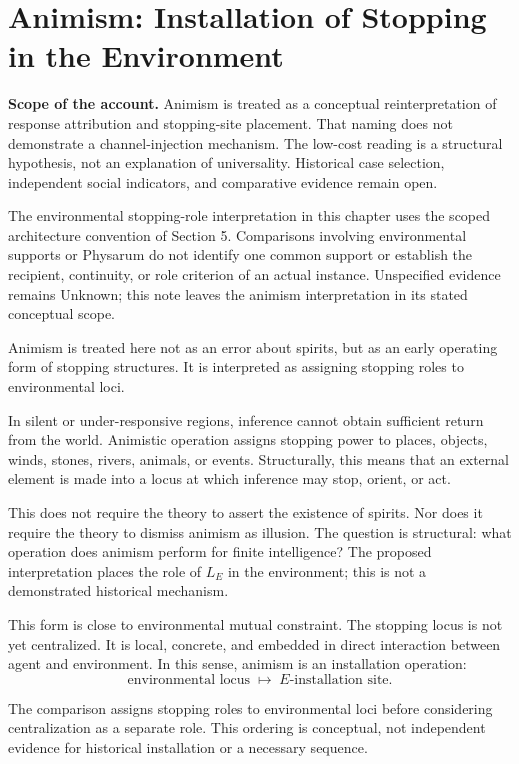 \section{Animism: Installation of Stopping in the Environment}

\noindent\textbf{Scope of the account.} Animism is treated as a conceptual reinterpretation of response attribution and stopping-site placement. That naming does not demonstrate a channel-injection mechanism. The low-cost reading is a structural hypothesis, not an explanation of universality. Historical case selection, independent social indicators, and comparative evidence remain open.

The environmental stopping-role interpretation in this chapter uses the scoped architecture convention of Section 5. Comparisons involving environmental supports or Physarum do not identify one common support or establish the recipient, continuity, or role criterion of an actual instance. Unspecified evidence remains Unknown; this note leaves the animism interpretation in its stated conceptual scope.


Animism is treated here not as an error about spirits, but as an early operating form of stopping structures. It is interpreted as assigning stopping roles to environmental loci.

In silent or under-responsive regions, inference cannot obtain sufficient return from the world. Animistic operation assigns stopping power to places, objects, winds, stones, rivers, animals, or events. Structurally, this means that an external element is made into a locus at which inference may stop, orient, or act.

This does not require the theory to assert the existence of spirits. Nor does it require the theory to dismiss animism as illusion. The question is structural: what operation does animism perform for finite intelligence? The proposed interpretation places the role of $L_E$ in the environment; this is not a demonstrated historical mechanism.

This form is close to environmental mutual constraint. The stopping locus is not yet centralized. It is local, concrete, and embedded in direct interaction between agent and environment. In this sense, animism is an installation operation:
\[
\text{environmental locus} \;\mapsto\; E\text{-installation site}.
\]

The comparison assigns stopping roles to environmental loci before considering centralization as a separate role. This ordering is conceptual, not independent evidence for historical installation or a necessary sequence.

\bigskip

